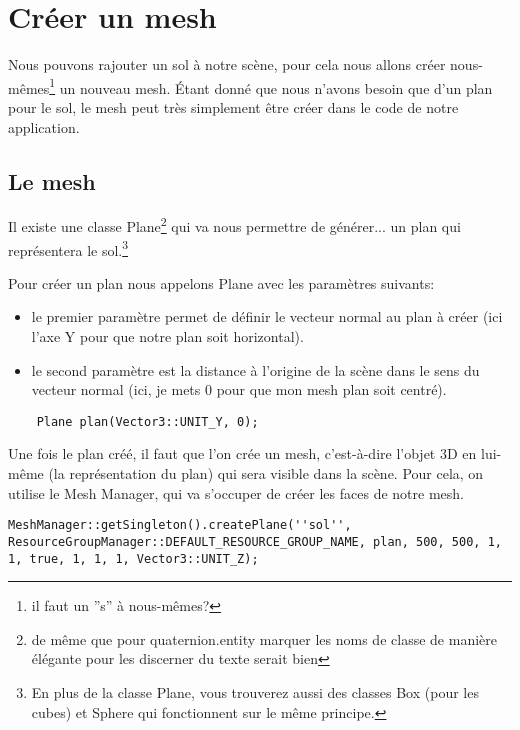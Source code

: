 \section{Cr\'eer un mesh}

Nous pouvons rajouter un sol \`{a} notre sc\`ene, pour cela nous allons cr\'eer nous-m\^emes\footnote{il faut un ''s'' \`a  nous-m\^emes?} un nouveau mesh. \'Etant donn\'e que nous n'avons besoin que d'un plan pour le sol, le mesh peut tr\`es simplement \^etre cr\'eer dans le code de notre application.



\subsection{Le mesh}

Il existe une classe Plane\footnote{de m\^eme que pour quaternion.entity marquer les noms de classe de manière \'el\'egante pour les discerner du texte serait bien} qui va nous permettre de g\'en\'erer... un plan qui repr\'esentera le sol.\footnote{En plus de la classe Plane, vous trouverez aussi des classes Box (pour les cubes) et Sphere qui fonctionnent sur le m\^eme principe.}\newline

Pour cr\'eer un plan nous appelons Plane avec les param\`etres suivants:
\begin{itemize}
\item le premier param\`etre permet de d\'efinir le vecteur normal au plan \`{a} cr\'eer (ici l'axe Y pour que notre plan soit horizontal).
\item le second param\`etre est la distance \`{a} l'origine de la sc\`ene dans le sens du vecteur normal  (ici, je mets 0 pour que mon mesh plan soit centr\'e). 
\end{itemize}

\begin{lstlisting}
	Plane plan(Vector3::UNIT_Y, 0);
\end{lstlisting}

Une fois le plan cr\'e\'e, il faut que l'on cr\'ee un mesh, c'est-\`{a}-dire l'objet 3D en lui-m\^eme (la repr\'esentation du plan) qui sera visible dans la sc\`ene.
Pour cela, on utilise le Mesh Manager, qui va s'occuper de cr\'eer les faces de notre mesh.

\begin{lstlisting}
MeshManager::getSingleton().createPlane(''sol'', ResourceGroupManager::DEFAULT_RESOURCE_GROUP_NAME, plan, 500, 500, 1, 1, true, 1, 1, 1, Vector3::UNIT_Z);
\end{lstlisting}


